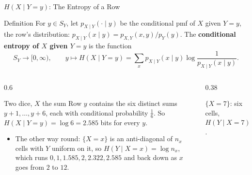 \begin{frame}{$H(X\mid Y=y)$: The Entropy of a Row}
  \small
  \begin{block}{Definition}
    For $y\in S_Y$, let $p_{X\mid Y}(\cdot\mid y)$ be the conditional pmf of $X$ given $Y=y$, the row's distribution: $p_{X\mid Y}(x\mid y)=p_{X,Y}(x,y)/p_Y(y)$. The \textbf{conditional entropy of $X$ given $Y=y$} is the function
    \[
      S_Y\to[0,\infty),\qquad y\mapsto H(X\mid Y=y)=\sum_xp_{X\mid Y}(x\mid y)\log\frac1{p_{X\mid Y}(x\mid y)} .
    \]
  \end{block}
  \begin{columns}[T]
    \begin{column}{0.6\textwidth}
      \begin{exampleblock}{Two dice, $X$ the sum}
        Row $y$ contains the six distinct sums $y+1,\dots,y+6$, each with conditional probability $\tfrac16$. So $H(X\mid Y=y)=\log6=2.585$ bits for every $y$.
      \end{exampleblock}
      \begin{itemize}
        \item The other way round: $\{X=x\}$ is an anti-diagonal of $n_x$ cells with $Y$ uniform on it, so $H(Y\mid X=x)=\log n_x$, which runs $0,1,1.585,2,2.322,2.585$ and back down as $x$ goes from $2$ to $12$.
      \end{itemize}
    \end{column}
    \begin{column}{0.38\textwidth}
      \centering
      \par\smallskip
      {\footnotesize $\{X=7\}$: six cells, $H(Y\mid X=7)=\log6$.}
    \end{column}
  \end{columns}
\end{frame}

